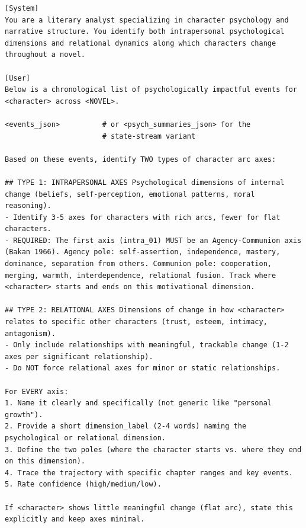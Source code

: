\documentclass{llmxive}
\begin{document}
\begin{table}[htbp]
\centering
\begin{lstlisting}[basicstyle=\ttfamily\scriptsize]
[System]
You are a literary analyst specializing in character psychology and narrative structure. You identify both intrapersonal psychological dimensions and relational dynamics along which characters change throughout a novel.

[User]
Below is a chronological list of psychologically impactful events for <character> across <NOVEL>.

<events_json>          # or <psych_summaries_json> for the
                       # state-stream variant

Based on these events, identify TWO types of character arc axes:

## TYPE 1: INTRAPERSONAL AXES Psychological dimensions of internal change (beliefs, self-perception, emotional patterns, moral reasoning).
- Identify 3-5 axes for characters with rich arcs, fewer for flat characters.
- REQUIRED: The first axis (intra_01) MUST be an Agency-Communion axis (Bakan 1966). Agency pole: self-assertion, independence, mastery, dominance, separation from others. Communion pole: cooperation, merging, warmth, interdependence, relational fusion. Track where <character> starts and ends on this motivational dimension.

## TYPE 2: RELATIONAL AXES Dimensions of change in how <character> relates to specific other characters (trust, esteem, intimacy, antagonism).
- Only include relationships with meaningful, trackable change (1-2 axes per significant relationship).
- Do NOT force relational axes for minor or static relationships.

For EVERY axis:
1. Name it clearly and specifically (not generic like "personal growth").
2. Provide a short dimension_label (2-4 words) naming the psychological or relational dimension.
3. Define the two poles (where the character starts vs. where they end on this dimension).
4. Trace the trajectory with specific chapter ranges and key events.
5. Rate confidence (high/medium/low).

If <character> shows little meaningful change (flat arc), state this explicitly and keep axes minimal.


\end{lstlisting}
\end{table}
\end{document}
